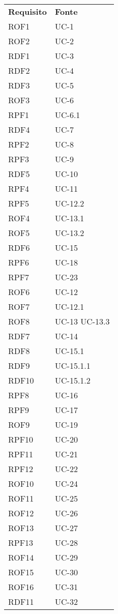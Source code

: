 \begin{longtable}{| p{5cm} | p{5cm} |}
		\rowcolor{LightBlue}
		\color{white}\bfseries Requisito & \color{white}\bfseries Fonte \\[0.25cm]
		\rowcolor{LightGray}
		ROF1 & UC-1 \\
		ROF2 & UC-2 \\
		\rowcolor{LightGray}
		RDF1 & UC-3 \\
		RDF2 & UC-4 \\
		\rowcolor{LightGray}
		RDF3 & UC-5 \\
		ROF3 & UC-6 \\
		\rowcolor{LightGray}
		RPF1 & UC-6.1 \\
		RDF4 & UC-7 \\
		\rowcolor{LightGray}
		RPF2 & UC-8 \\
		RPF3 & UC-9 \\
		\rowcolor{LightGray}
		RDF5 & UC-10 \\
		RPF4 & UC-11 \\
		\rowcolor{LightGray}
		RPF5 &UC-12.2 \\
		ROF4 & UC-13.1 \\
		\rowcolor{LightGray}
		ROF5 & UC-13.2 \\
		RDF6 & UC-15 \\
		\rowcolor{LightGray}
		RPF6 & UC-18 \\
		RPF7 & UC-23 \\
		\rowcolor{LightGray}
		ROF6 & UC-12 \\
		ROF7 & UC-12.1 \\
		\rowcolor{LightGray}
		ROF8 & UC-13 \newline UC-13.3 \\
		RDF7 & UC-14\\
		\rowcolor{LightGray}
		RDF8 & UC-15.1\\
		RDF9 & UC-15.1.1\\
		\rowcolor{LightGray}
		RDF10 & UC-15.1.2\\
		RPF8 & UC-16\\
		\rowcolor{LightGray}
		RPF9 & UC-17\\
		ROF9 & UC-19 \\
		\rowcolor{LightGray}
		RPF10 & UC-20\\
		RPF11 & UC-21 \\
		\rowcolor{LightGray}
		RPF12 & UC-22 \\
		ROF10 & UC-24 \\
		\rowcolor{LightGray}
		ROF11 & UC-25 \\
		ROF12 & UC-26 \\
		\rowcolor{LightGray}
		ROF13 & UC-27 \\
		RPF13 & UC-28 \\
		\rowcolor{LightGray}
		ROF14 & UC-29 \\
		ROF15 & UC-30 \\
		\rowcolor{LightGray}
		ROF16 & UC-31 \\
		RDF11 & UC-32 \\		
		\hline
\end{longtable}

